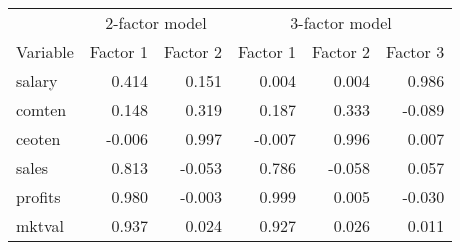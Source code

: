 \begin{tabular}{lrrrrr}
\toprule
 & \multicolumn{2}{c}{2-factor model} & \multicolumn{3}{c}{3-factor model} \\ 
\cmidrule(lr){2-3} \cmidrule(lr){4-6}
Variable & Factor 1 & Factor 2 & Factor 1 & Factor 2 & Factor 3 \\ 
\midrule\addlinespace[2.5pt]
salary & 0.414 & 0.151 & 0.004 & 0.004 & 0.986 \\ 
comten & 0.148 & 0.319 & 0.187 & 0.333 & -0.089 \\ 
ceoten & -0.006 & 0.997 & -0.007 & 0.996 & 0.007 \\ 
sales & 0.813 & -0.053 & 0.786 & -0.058 & 0.057 \\ 
profits & 0.980 & -0.003 & 0.999 & 0.005 & -0.030 \\ 
mktval & 0.937 & 0.024 & 0.927 & 0.026 & 0.011 \\ 
\bottomrule
\end{tabular}

